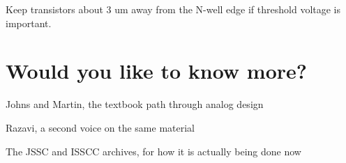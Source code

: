 Keep transistors about 3 um away from the N-well edge if threshold
voltage is important.

\section{Would you like to know
more?}\label{would-you-like-to-know-more}

Johns and Martin, the textbook path through analog design

Razavi, a second voice on the same material

The JSSC and ISSCC archives, for how it is actually being done now

\label{refs}
\begin{CSLReferences}{0}{0}
\CSLLeftMargin{{[}1{]} }%

\CSLLeftMargin{{[}2{]} }%

\end{CSLReferences}
